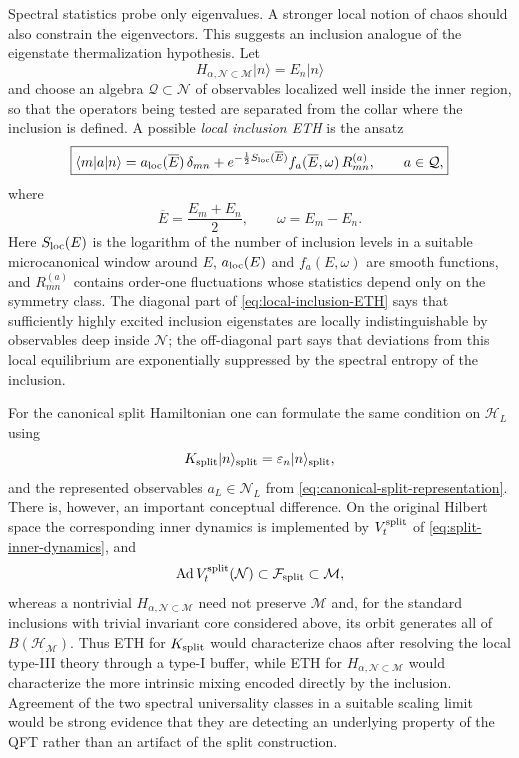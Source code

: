 \documentclass[a4paper,11pt]{article}
\theoremstyle{definition}
\newcommand{\mN}{\mathcal{N}}
\newcommand{\mH}{\mathcal{H}}
\newcommand{\mM}{\mathcal{M}}
\newcommand{\Ad}{\operatorname{Ad}}
\begin{document}
Spectral statistics probe only eigenvalues.  A stronger local notion of chaos should also constrain the eigenvectors.  This suggests an inclusion analogue of the eigenstate thermalization hypothesis.  Let
\begin{equation}
    H_{\alpha,\mN\subset\mM}|n\rangle=E_n|n\rangle
\end{equation}
and choose an algebra $\mathcal Q\subset\mN$ of observables localized well inside the inner region, so that the operators being tested are separated from the collar where the inclusion is defined.  A possible \emph{local inclusion ETH} is the ansatz
\begin{equation}
    \boxed{
    \langle m|a|n\rangle
    =
    a_{\rm loc}(\overline E)\,\delta_{mn}
    +
    e^{-\frac12 S_{\rm loc}(\overline E)}
    f_a(\overline E,\omega)\,
    R^{(a)}_{mn},
    \qquad
    a\in\mathcal Q ,
    }
    \label{eq:local-inclusion-ETH}
\end{equation}
where
\begin{equation}
    \overline E=\frac{E_m+E_n}{2},
    \qquad
    \omega=E_m-E_n.
\end{equation}
Here $S_{\rm loc}(E)$ is the logarithm of the number of inclusion levels in a suitable microcanonical window around $E$, $a_{\rm loc}(E)$ and $f_a(E,\omega)$ are smooth functions, and $R^{(a)}_{mn}$ contains order-one fluctuations whose statistics depend only on the symmetry class.  The diagonal part of \eqref{eq:local-inclusion-ETH} says that sufficiently highly excited inclusion eigenstates are locally indistinguishable by observables deep inside $\mN$; the off-diagonal part says that deviations from this local equilibrium are exponentially suppressed by the spectral entropy of the inclusion.

For the canonical split Hamiltonian one can formulate the same condition on $\mathcal H_L$ using
\begin{equation}
    K_{\rm split}|n\rangle_{\rm split}
    =
    \varepsilon_n|n\rangle_{\rm split},
\end{equation}
and the represented observables $a_L\in\mN_L$ from \eqref{eq:canonical-split-representation}. There is, however, an important conceptual difference. On the original Hilbert space the corresponding inner dynamics is implemented by $V_t^{\rm split}$ of \eqref{eq:split-inner-dynamics}, and
\begin{equation}
    \Ad V_t^{\rm split}(\mN)
    \subset\mathcal F_{\rm split}\subset\mM,
\end{equation}
whereas a nontrivial $H_{\alpha,\mN\subset\mM}$ need not preserve $\mM$ and, for the standard inclusions with trivial invariant core considered above, its orbit generates all of $B(\mH_{\mM})$.  Thus ETH for $K_{\rm split}$ would characterize chaos after resolving the local type-III theory through a type-I buffer, while ETH for $H_{\alpha,\mN\subset\mM}$ would characterize the more intrinsic mixing encoded directly by the inclusion.  Agreement of the two spectral universality classes in a suitable scaling limit would be strong evidence that they are detecting an underlying property of the QFT rather than an artifact of the split construction.
\end{document}
